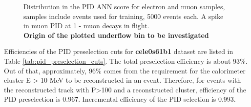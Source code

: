 \begin{figure}[H]
  \caption{
    \label{fig:pid_training_4}
    Distribution in the PID ANN score for electron and muon samples, samples include events used for training,
    5000 events each. A spike in muon PID at 1  - muon decays in flight. \\ 
    {\color{red} \bf Origin of the plotted underflow bin to be investigated}
  }
\end{figure}

Efficiencies of the PID preselection cuts for {\bf cele0s61b1} dataset are listed
in Table \ref{tab:pid_preselection_cuts}. The total preselection efficiency is about 93\%.
%
Out of that, approximately, 96\% comes from the requirement for the calorimeter cluster E > 10 MeV to be reconstructed in an event.
Therefore, for events with the reconstructed track with P>100 and a reconstructed cluster, efficiency
of the PID preselection is 0.967. Incremental efficiency of the PID selection is 0.993.

